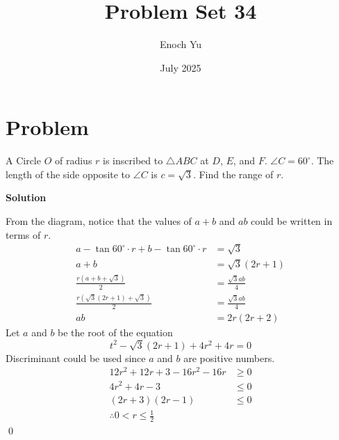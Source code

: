 \documentclass{article}
\title{Problem Set 34}
\author{Enoch Yu}
\date{July 2025}
\newenvironment{solution}{\begin{trivlist}\item[]{\bf Solution}}{\qed \end{trivlist}}
\begin{document}
\section*{Problem}
A Circle $O$ of radius $r$ is inscribed to $\triangle{ABC}$ at $D$, $E$, and $F$. $\angle{C} = 60^\circ$. The length of the side opposite to $\angle{C}$ is $c = \sqrt{3}$. Find the range of $r$.
\begin{solution}
\begin{center}
\end{center}
From the diagram, notice that the values of $a + b$ and $ab$ could be written in terms of $r$.
\begin{align*}
    a - \tan60^\circ \cdot r + b - \tan60^\circ \cdot r &= \sqrt{3} \\
    a + b &= \sqrt{3}(2r + 1) \\
    \frac{r(a + b + \sqrt{3})}{2} &= \frac{\sqrt{3}ab}{4} \\
    \frac{r\left( \sqrt{3}(2r + 1) + \sqrt{3} \right)}{2} &= \frac{\sqrt{3}ab}{4} \\
    ab &= 2r(2r + 2)
\end{align*}
Let $a$ and $b$ be the root of the equation
\[
t^2 - \sqrt{3}(2r + 1) + 4r^2 + 4r = 0
\]
Discriminant could be used since $a$ and $b$ are positive numbers.
\begin{align*}
    12r^2 + 12r + 3 - 16r^2 - 16r &\geq 0 \\
    4r^2 + 4r - 3 &\leq 0 \\
    (2r + 3)(2r - 1) &\leq 0 \\
    \therefore \boxed{0 < r \leq \frac{1}{2}}
\end{align*}
\end{solution}
\end{document}
